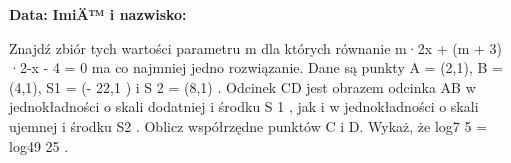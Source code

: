 \documentclass[addpoints]{exam}
\begin{document}
\raggedleft \textbf {Data:\enspace\makebox[2in]{\hrulefill}} 
\hfill  \textbf{ImiÄ™ i nazwisko: \enspace\makebox[2in]{\hrulefill}}
	
\vspace{0.1in}

	\begin{questions}

	Znajdź zbiór tych wartości parametru m dla których równanie m·2x + (m + 3) ·2-x - 4 = 0 ma co najmniej jedno rozwiązanie.
Dane są punkty A = (2,1), B = (4,1), S1 = (- 22,1 ) i S 2 = (8,1) . Odcinek CD jest obrazem odcinka AB w jednokładności o skali dodatniej i środku S 1 , jak i w jednokładności o skali ujemnej i środku S2 . Oblicz współrzędne punktów C i D.
Wykaż, że log7 5 = log49 25 .


	\end{questions}
\end{document}
